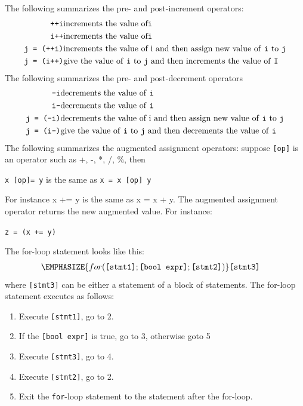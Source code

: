 \begin{console}
The following summarizes the pre- and post-increment operators:
\begin{align*}
\texttt{++i} &\text{increments the value of} \texttt{i}\\
\texttt{i++} &\text{increments the value of} \texttt{i}\\
\texttt{j = (++i)} &\text{increments the value of i and then assign new value of
\texttt{i} to \texttt{j}}\\
\texttt{j = (i++)} &\text{give the value of \texttt{i} to \texttt{j} and then
increments the value of \texttt{I}}\\
\end{align*}
The following summarizes the pre- and post-decrement operators
\begin{align*}
\texttt{--i} &\text{decrements the value of \texttt{i}}\\
\texttt{i--} &\text{decrements the value of \texttt{i}}\\
\texttt{j = (--i)} &\text{decrements the value of i and then assign new value
of \texttt{i} to \texttt{j}}\\
\texttt{j = (i--)} &\text{give the value of \texttt{i} to \texttt{j} and then
decrements the value of \texttt{i}}\\
\end{align*}
The following summarizes the augmented assignment operators: suppose
\texttt{[op]} is an operator such as +, -, *, /, \%, then
\begin{center}
\texttt{x [op]= y}     is the same as      \texttt{x = x [op] y}
\end{center}
For instance x += y is the same as x = x + y. The augmented assignment
operator returns the new augmented value. For instance:
\begin{center}
\texttt{z = (x += y)}
\end{center}
The for-loop statement looks like this:
\begin{align*}
\EMPHASIZE{for (\texttt{[stmt1]}; \texttt{[bool expr]}; \texttt{[stmt2]})}
&\texttt{[stmt3]}
\end{align*}
where \texttt{[stmt3]} can be either a statement of a block of
statements. The for-loop statement executes as follows:

\begin{enumerate}
\item
  Execute \texttt{[stmt1]}, go to 2.
\item
  If the \texttt{[bool expr]} is true, go to 3, otherwise goto 5
\item
  Execute \texttt{[stmt3]}, go to 4.
\item
  Execute \texttt{[stmt2]}, go to 2.
\item
  Exit the \texttt{for}-loop statement to the statement after the for-loop.
\end{enumerate}


\end{console}
